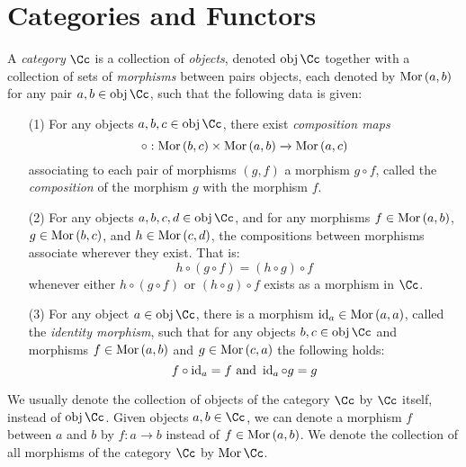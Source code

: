 \section{Categories and Functors}\label{section_1.1}

\begin{definition}
  A \textit{category} $\Cc$ is a collection of \textit{objects},
  denoted $\obj{\Cc}$ together with a collection of sets of
  \textit{morphisms} between pairs objects, each denoted by
  $\operatorname{Mor}{(a,b)}$ for any pair $a,b \in \obj{\Cc}$, such that the
  following data is given:
  \begin{enumerate}
    \item[(1)] For any objects $a,b,c \in \obj{\Cc}$, there exist
      \textit{composition maps}
      \begin{equation*}
        \circ:\operatorname{Mor}{(b,c)} \times \operatorname{Mor}{(a,b)} \xrightarrow{} \operatorname{Mor}{(a,c)}
      \end{equation*}
      associating to each pair of
      morphisms $(g,f)$ a morphism $g \circ f$, called the
      \textit{composition} of the morphism $g$ with the morphism $f$.

    \item[(2)] For any objects $a,b,c,d \in \obj{\Cc}$, and for any
      morphisms $f \in \operatorname{Mor}{(a,b)}$, $g \in \operatorname{Mor}{(b,c)}$, and $h \in
      \operatorname{Mor}{(c,d)}$, the compositions between morphisms associate
      wherever they exist. That is:
      \begin{equation*}
        h \circ (g \circ f)=(h \circ g) \circ f
      \end{equation*}
      whenever either $h \circ (g \circ f)$ or $(h \circ g) \circ f$
      exists as a morphism in $\Cc$.

    \item[(3)] For any object $a \in \obj{\Cc}$, there is a morphism
      $\operatorname{id}_a \in \operatorname{Mor}{(a,a)}$, called the \textit{identity morphism},
      such that for any objects $b,c \in \obj{\Cc}$ and morphisms $f
      \in \operatorname{Mor}{(a,b)}$ and $g \in \operatorname{Mor}{(c,a)}$ the following holds:
      \begin{equation*}
        f \circ \operatorname{id}_a=f \text{ and } \operatorname{id}_a \circ g=g
      \end{equation*}
  \end{enumerate}
  We usually denote the collection of objects of the category
  $\Cc$ by $\Cc$ itself, instead of $\obj{\Cc}$. Given objects
  $a,b \in \Cc$, we can denote a morphism $f$ between $a$ and $b$
  by $f:a \xrightarrow{} b$ instead of $f \in \operatorname{Mor}{(a,b)}$. We
  denote the collection of all morphisms of the category $\Cc$ by
  $\Mor{\Cc}$.
\end{definition}

